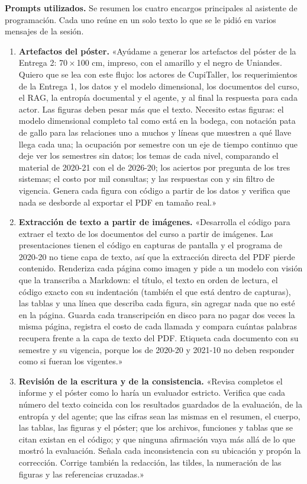 \documentclass[11pt,letterpaper]{article}
\begin{document}
\textbf{Prompts utilizados.} Se resumen los cuatro encargos principales al asistente de programación. Cada uno reúne en un solo texto lo que se le pidió en varios mensajes de la sesión.

\begin{enumerate}[leftmargin=1.5em,itemsep=4pt]
\item \textbf{Artefactos del póster.} «Ayúdame a generar los artefactos del póster de la Entrega 2: 70\,×\,100 cm, impreso, con el amarillo y el negro de Uniandes. Quiero que se lea con este flujo: los actores de CupiTaller, los requerimientos de la Entrega 1, los datos y el modelo dimensional, los documentos del curso, el RAG, la entropía documental y el agente, y al final la respuesta para cada actor. Las figuras deben pesar más que el texto. Necesito estas figuras: el modelo dimensional completo tal como está en la bodega, con notación pata de gallo para las relaciones uno a muchos y líneas que muestren a qué llave llega cada una; la ocupación por semestre con un eje de tiempo continuo que deje ver los semestres sin datos; los temas de cada nivel, comparando el material de 2020-21 con el de 2026-20; los aciertos por pregunta de los tres sistemas; el costo por mil consultas; y las respuestas con y sin filtro de vigencia. Genera cada figura con código a partir de los datos y verifica que nada se desborde al exportar el PDF en tamaño real.»
\item \textbf{Extracción de texto a partir de imágenes.} «Desarrolla el código para extraer el texto de los documentos del curso a partir de imágenes. Las presentaciones tienen el código en capturas de pantalla y el programa de 2020-20 no tiene capa de texto, así que la extracción directa del PDF pierde contenido. Renderiza cada página como imagen y pide a un modelo con visión que la transcriba a Markdown: el título, el texto en orden de lectura, el código exacto con su indentación (también el que está dentro de capturas), las tablas y una línea que describa cada figura, sin agregar nada que no esté en la página. Guarda cada transcripción en disco para no pagar dos veces la misma página, registra el costo de cada llamada y compara cuántas palabras recupera frente a la capa de texto del PDF. Etiqueta cada documento con su semestre y su vigencia, porque los de 2020-20 y 2021-10 no deben responder como si fueran los vigentes.»
\item \textbf{Revisión de la escritura y de la consistencia.} «Revisa completos el informe y el póster como lo haría un evaluador estricto. Verifica que cada número del texto coincida con los resultados guardados de la evaluación, de la entropía y del agente; que las cifras sean las mismas en el resumen, el cuerpo, las tablas, las figuras y el póster; que los archivos, funciones y tablas que se citan existan en el código; y que ninguna afirmación vaya más allá de lo que mostró la evaluación. Señala cada inconsistencia con su ubicación y propón la corrección. Corrige también la redacción, las tildes, la numeración de las figuras y las referencias cruzadas.»

\end{enumerate}
\end{document}
